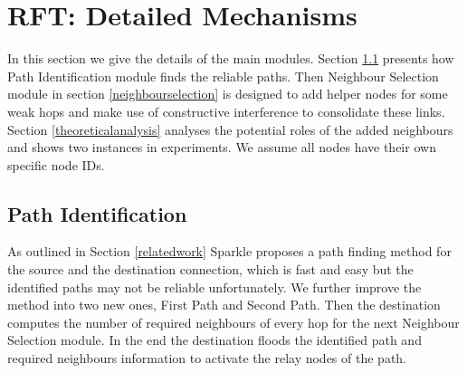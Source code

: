 \documentclass[conference]{IEEEtran}
\begin{document}
\section{RFT: Detailed Mechanisms} 
\label{RFTdetail}
In this section we give the details of the main modules. Section \ref{pathidentify} presents how Path Identification module finds the reliable paths. Then Neighbour Selection module in section \ref{neighbourselection} is designed to add helper nodes for some weak hops and make use of constructive interference to consolidate these links. Section \ref{theoreticalanalysis} analyses the potential roles of the added neighbours and shows two instances in experiments. We assume all nodes have their own specific node IDs.%
\subsection{Path Identification}
\label{pathidentify}
As outlined in Section \ref{relatedwork} Sparkle proposes a path finding method for the source and the destination connection, which is fast and easy but the identified paths may not be reliable unfortunately. We further improve the method into two new ones, First Path and Second Path. Then the destination computes the number of required neighbours of every hop for the next Neighbour Selection module. In the end the destination floods the identified path and required neighbours information to activate the relay nodes of the path.
\end{document}
